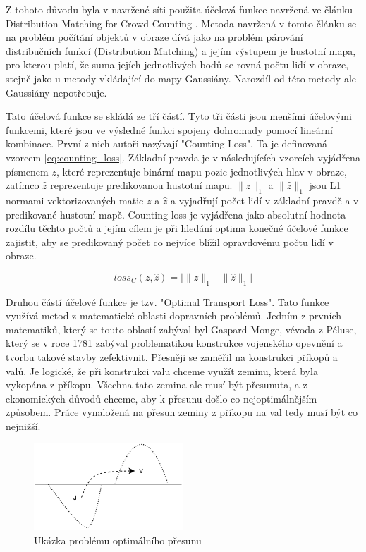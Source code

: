 Z tohoto důvodu byla v navržené síti použita účelová funkce navržená ve článku Distribution Matching for Crowd Counting \cite{DM_Count}.
Metoda navržená v tomto článku se na problém počítání objektů v obraze dívá jako na problém párování distribučních funkcí (Distribution Matching) a jejím výstupem je hustotní mapa, pro kterou platí, že suma jejích jednotlivých bodů se rovná počtu lidí v obraze, stejně jako u metody vkládající do mapy Gaussiány. Narozdíl od této metody ale Gaussiány nepotřebuje.

Tato účelová funkce se skládá ze tří částí.
Tyto tři části jsou menšími účelovými funkcemi, které jsou ve výsledné funkci spojeny dohromady pomocí lineární kombinace.
První z nich autoři nazývají "Counting Loss".
Ta je definovaná vzorcem \ref{eq:counting_loss}.
Základní pravda je v následujících vzorcích vyjádřena písmenem \(z\), které reprezentuje binární mapu pozic jednotlivých hlav v obraze, zatímco \(\hat{z}\) reprezentuje predikovanou hustotní mapu.
\(\|z\|_1\) a \(\|\hat{z}\|_1\) jsou L1 normami vektorizovaných matic \(z\) a \(\hat{z}\) a vyjadřují počet lidí v základní pravdě a v predikované hustotní mapě.
Counting loss je vyjádřena jako absolutní hodnota rozdílu těchto počtů a jejím cílem je při hledání optima konečné účelové funkce zajistit, aby se predikovaný počet co nejvíce blížil opravdovému počtu lidí v obraze.

\begin{equation}
loss_C(z, \hat{z}) = \Big|\|{z}\|_1 - \|\hat{z}\|_1\Big|
\label{eq:counting_loss}
\end{equation}

Druhou částí účelové funkce je tzv. "Optimal Transport Loss". 
Tato funkce využívá metod z matematické oblasti dopravních problémů.
Jedním z prvních matematiků, který se touto oblastí zabýval byl Gaspard Monge, vévoda z Péluse, který se v roce 1781 zabýval problematikou konstrukce vojenského opevnění a tvorbu takové stavby zefektivnit.
Přesněji se zaměřil na konstrukci příkopů a valů.
Je logické, že při konstrukci valu chceme využít zeminu, která byla vykopána z příkopu.
Všechna tato zemina ale musí být přesunuta, a z ekonomických důvodů chceme, aby k přesunu došlo co nejoptimálnějším způsobem.
Práce vynaložená na přesun zeminy z příkopu na val tedy musí být co nejnižší.

\begin{figure}[h!]
	\centering
	\includegraphics[width=0.5\textwidth]{Figures/solution/Optimal_transport.pdf}
	\caption{Ukázka problému optimálního přesunu}
	\label{fig:RNN_architecture}
\end{figure}


